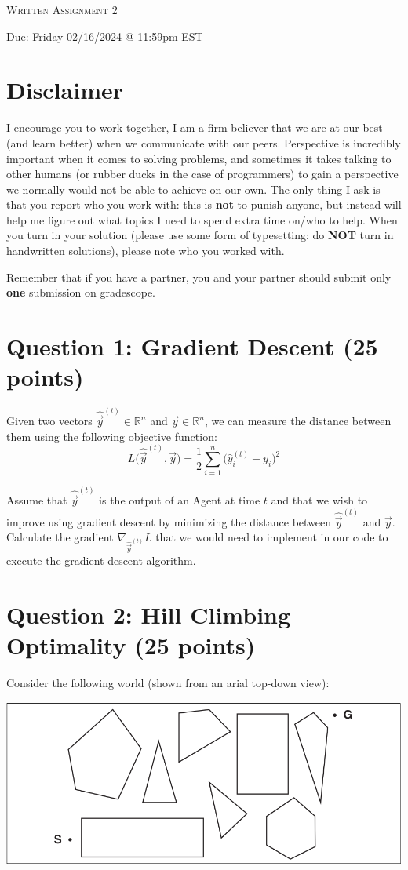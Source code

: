 \documentclass[11pt]{article}
\newcommand{\question}[1]{\section*{\normalsize #1}}
\begin{document}
\begin{center}
    {\Large \textsc{Written Assignment 2}}
\end{center}
\begin{center}
    Due: Friday 02/16/2024 @ 11:59pm EST
\end{center}

\section*{\textbf{Disclaimer}}
I encourage you to work together, I am a firm believer that we are at our best (and learn better) when we communicate with our peers. Perspective is incredibly important when it comes to solving problems, and sometimes it takes talking to other humans (or rubber ducks in the case of programmers) to gain a perspective we normally would not be able to achieve on our own. The only thing I ask is that you report who you work with: this is \textbf{not} to punish anyone, but instead will help me figure out what topics I need to spend extra time on/who to help. When you turn in your solution (please use some form of typesetting: do \textbf{NOT} turn in handwritten solutions), please note who you worked with.\newline

\noindent Remember that if you have a partner, you and your partner should submit only \textbf{one} submission on gradescope.



\question{Question 1: Gradient Descent (25 points)}
Given two vectors $\hat{\vec{y}}^{(t)}\in \mathbb{R}^{n}$ and $\vec{y}\in \mathbb{R}^{n}$, we can measure the distance between them using the following objective function:
$$L\Big(\hat{\vec{y}}^{(t)}, \vec{y}\Big) = \frac{1}{2}\sum\limits_{i=1}^n \Big(\hat{y}_i^{(t)} - y_i\Big)^2$$

\noindent Assume that $\hat{\vec{y}}^{(t)}$ is the output of an Agent at time $t$ and that we wish to improve using gradient descent by minimizing the distance between $\hat{\vec{y}}^{(t)}$ and $\vec{y}$. Calculate the gradient $\nabla_{\hat{\vec{y}}^{(t)}} L$ that we would need to implement in our code to execute the gradient descent algorithm.
\newpage




\question{Question 2: Hill Climbing Optimality (25 points)}
Consider the following world (shown from an arial top-down view):

\includegraphics[width=0.8\linewidth]{./imgs/polygon_hill_climbing_map.png}
\end{document}
